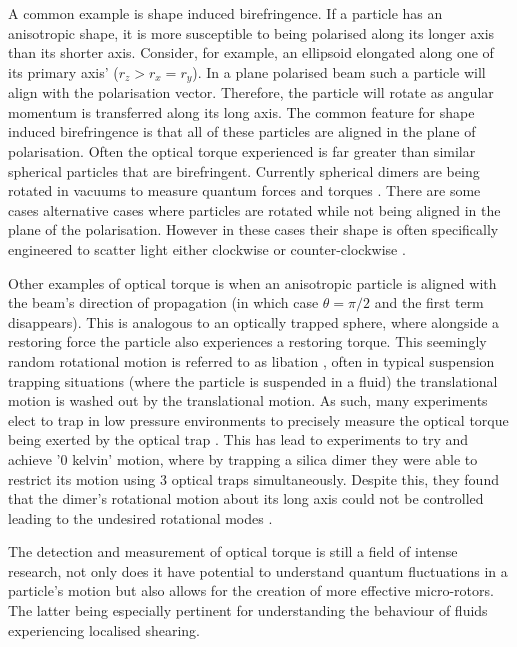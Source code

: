 A common example is shape induced birefringence. If a particle has an 
anisotropic shape, it is more susceptible to being polarised along its 
longer axis than its shorter axis. Consider, for example, an ellipsoid 
elongated along one of its primary axis' ($r_z > r_x = r_y$). In a 
plane polarised beam such a particle will align with the polarisation
vector. Therefore, the particle will rotate as angular momentum is 
transferred along its long axis. The common feature for shape induced
birefringence is that all of these particles are aligned in the plane
of polarisation. Often the optical torque experienced is far greater 
than similar spherical particles that are birefringent. Currently 
spherical dimers are being rotated in vacuums to measure quantum forces
and torques \cite{Ahn2018, Reimann2018}. There are some cases alternative 
cases where particles are rotated while not being aligned in the plane 
of the polarisation. However in these cases their shape is often 
specifically engineered to scatter light either clockwise or 
counter-clockwise \cite{Higurashi1994}. 

Other examples of optical torque is when an anisotropic particle is 
aligned with the beam's direction of propagation (in which case $\theta
=\pi/2$ and the first term disappears). This is analogous to an optically 
trapped sphere, where alongside a restoring force the particle also 
experiences a restoring torque. This seemingly random rotational motion
is referred to as libation \cite{Bruce2020}, often in typical suspension
trapping situations (where the particle is suspended in a fluid) the 
translational motion is washed out by the translational motion. As such, 
many experiments elect to trap in low pressure environments to precisely 
measure the optical torque being exerted by the optical trap \cite{Ahn2018}.
This has lead to experiments to try and achieve '0 kelvin' motion, where
by trapping a silica dimer they were able to restrict its motion using 
3 optical traps simultaneously. Despite this, they found that the dimer's
rotational motion about its long axis could not be controlled leading to
the undesired rotational modes \cite{Bang2020}.

The detection and measurement of optical torque is still a field of intense
research, not only does it have potential to understand quantum fluctuations
in a particle's motion but also allows for the creation of more effective
micro-rotors. The latter being especially pertinent for understanding the 
behaviour of fluids experiencing localised shearing.

